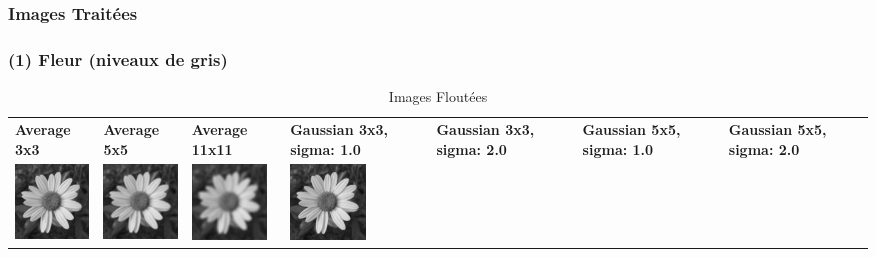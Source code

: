 \newpage
\subsubsection{Images Traitées}

\subsubsection*{(1) Fleur (niveaux de gris)}

\begin{table}[h!]
    \centering
    \captionsetup{justification=centering}
    \caption*{Images Floutées}
    \begin{tabular}{>{\centering\arraybackslash} m{2cm} >{\centering\arraybackslash} m{2cm} >{\centering\arraybackslash} m{2cm} >{\centering\arraybackslash} m{2cm} >{\centering\arraybackslash} m{2cm} >{\centering\arraybackslash} m{2cm} >{\centering\arraybackslash} m{2cm}}
        \textbf{Average 3x3}                                                                   & \textbf{Average 5x5} & \textbf{Average 11x11} & \textbf{Gaussian 3x3, sigma: 1.0} & \textbf{Gaussian 3x3, sigma: 2.0} & \textbf{Gaussian 5x5, sigma: 1.0} & \textbf{Gaussian 5x5, sigma: 2.0} \\
        \includegraphics[width=2cm]{images/processed/flower/average_3x3/blurred.png}           &
        \includegraphics[width=2cm]{images/processed/flower/average_5x5/blurred.png}           &
        \includegraphics[width=2cm]{images/processed/flower/average_11x11/blurred.png}         &
        \includegraphics[width=2cm]{images/processed/flower/gaussian_3x3_sigma1.0/blurred.png} &

\end{tabular}
\end{table}
